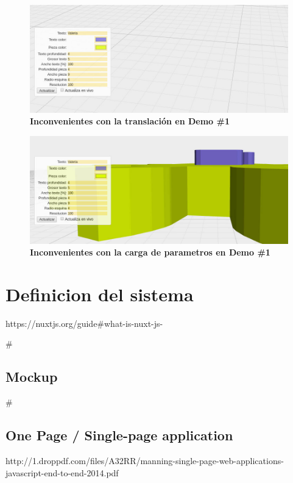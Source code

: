 \begin{figure}[h]
    \includegraphics[width=16cm]{Img/Desarrollo/feedback3.jpg}
    \centering
    \caption{\textbf{ \footnotesize{Inconvenientes con la translación en Demo \#1}}}
     \label{fig:feedback2}
\end{figure}

\begin{figure}[h]
    \includegraphics[width=16cm]{Img/Desarrollo/feedback1.jpg}
    \centering
    \caption{\textbf{ \footnotesize{Inconvenientes con la carga de parametros en Demo \#1}}}
     \label{fig:feedback3}
\end{figure}

\clearpage
\section{Definicion del sistema}
https://nuxtjs.org/guide#what-is-nuxt-js-

#\subsection{Mockup}

#\subsection{One Page / Single-page application}
http://1.droppdf.com/files/A32RR/manning-single-page-web-applications-javascript-end-to-end-2014.pdf

